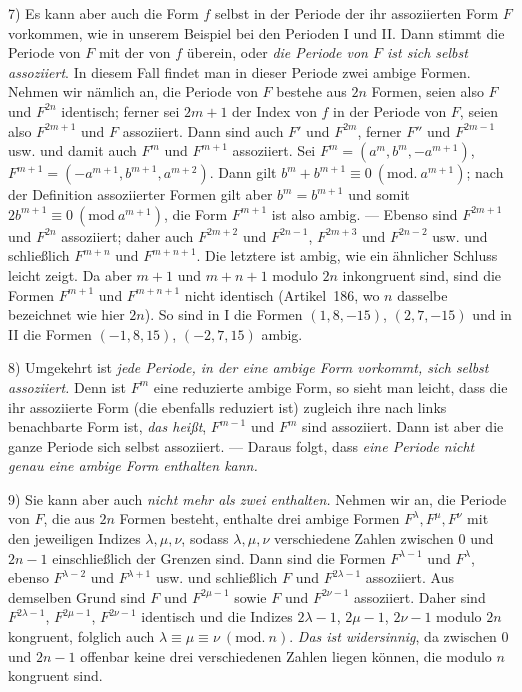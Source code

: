 7) Es kann aber auch die Form $f$ selbst in der Periode der ihr assoziierten Form $F$ vorkommen, wie in unserem Beispiel bei den Perioden I und II. Dann stimmt die Periode von $F$ mit der von $f$ überein, oder \textit{die Periode von $F$ ist sich selbst assoziiert}. In diesem Fall findet man in dieser Periode zwei ambige Formen. Nehmen wir nämlich an, die Periode von $F$ bestehe aus $2n$ Formen, seien also $F$ und $F^{2n}$ identisch; ferner sei $2m+1$ der Index von $f$ in der Periode von $F$, seien also $F^{2m+1}$ und $F$ assoziiert. Dann sind auch $F'$ und $F^{2m}$, ferner $F''$ und $F^{2m-1}$ usw. und damit auch $F^m$ und $F^{m+1}$ assoziiert. Sei $F^m=(a^m,b^m,-a^{m+1})$, $F^{m+1}=(-a^{m+1},b^{m+1},a^{m+2})$. Dann gilt $b^m+b^{m+1}\equiv0\ (\mathrm{mod.}\ a^{m+1})$; nach der Definition assoziierter Formen gilt aber $b^m=b^{m+1}$ und somit $2b^{m+1}\equiv0\ (\mathrm{mod}\ a^{m+1})$, die Form $F^{m+1}$ ist also ambig. --- Ebenso sind $F^{2m+1}$ und $F^{2n}$ assoziiert; daher auch $F^{2m+2}$ und $F^{2n-1}$, $F^{2m+3}$ und $F^{2n-2}$ usw. und schließlich $F^{m+n}$ und $F^{m+n+1}$. Die letztere ist ambig, wie ein ähnlicher Schluss leicht zeigt. Da aber $m+1$ und $m+n+1$ modulo $2n$ inkongruent sind, sind die Formen $F^{m+1}$ und $F^{m+n+1}$ nicht identisch (Artikel~186, wo $n$ dasselbe bezeichnet wie hier $2n$). So sind in I die Formen $(1,8,-15)$, $(2,7,-15)$ und in II die Formen $(-1,8,15)$, $(-2,7,15)$ ambig.

8) Umgekehrt ist \textit{jede Periode, in der eine ambige Form vorkommt, sich selbst assoziiert.} Denn ist $F^m$ eine reduzierte ambige Form, so sieht man leicht, dass die ihr assoziierte Form (die ebenfalls reduziert ist) zugleich ihre nach links benachbarte Form ist, \textit{das heißt}, $F^{m-1}$ und $F^m$ sind assoziiert. Dann ist aber die ganze Periode sich selbst assoziiert. --- Daraus folgt, dass \textit{eine Periode nicht genau eine ambige Form enthalten kann.}

9) Sie kann aber auch \textit{nicht mehr als zwei enthalten.} Nehmen wir an, die Periode von $F$, die aus $2n$ Formen besteht, enthalte drei ambige Formen $F^\lambda,F^\mu,F^\nu$ mit den jeweiligen Indizes $\lambda,\mu,\nu$, sodass $\lambda,\mu,\nu$ verschiedene Zahlen zwischen $0$ und $2n-1$ einschließlich der Grenzen sind. Dann sind die Formen $F^{\lambda-1}$ und $F^\lambda$, ebenso $F^{\lambda-2}$ und $F^{\lambda+1}$ usw. und schließlich $F$ und $F^{2\lambda-1}$ assoziiert. Aus demselben Grund sind $F$ und $F^{2\mu-1}$ sowie $F$ und $F^{2\nu-1}$ assoziiert. Daher sind $F^{2\lambda-1}$, $F^{2\mu-1}$, $F^{2\nu-1}$ identisch und die Indizes $2\lambda-1$, $2\mu-1$, $2\nu-1$ modulo $2n$ kongruent, folglich auch $\lambda\equiv\mu\equiv\nu\ (\mathrm{mod.}\ n)$. \textit{Das ist widersinnig}, da zwischen $0$ und $2n-1$ offenbar keine drei verschiedenen Zahlen liegen können, die modulo $n$ kongruent sind.
